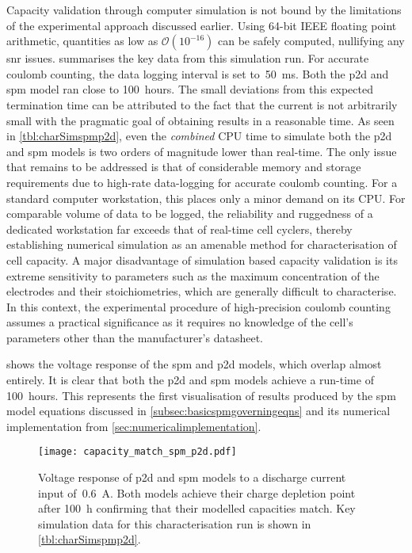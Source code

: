 Capacity validation through computer simulation  is not bound by the limitations
of the experimental approach discussed earlier. Using 64-bit IEEE floating point
arithmetic,  quantities  as  low  as  ${\mathcal{O}(10^{-16})}$  can  be  safely
computed, nullifying  any \gls{snr} issues.   summarises
the key data  from this simulation run. For accurate  coulomb counting, the data
logging  interval  is set  to~\SI{50}{\milli\second}.  Both the  \gls{p2d}  and
\gls{spm} model ran close to 100~hours.  The small deviations from this expected
termination  time  can  be attributed  to  the  fact  that  the current  is  not
arbitrarily small with  the pragmatic goal of obtaining results  in a reasonable
time. As seen in \cref{tbl:charSimspmp2d},  even the \emph{combined} CPU time to
simulate both  the \gls{p2d}  and \gls{spm}  models is  two orders  of magnitude
lower than  real-time. The only  issue that remains to  be addressed is  that of
considerable memory and  storage requirements due to  high-rate data-logging for
accurate coulomb counting. For a standard computer workstation, this places only
a minor  demand on  its CPU.  For comparable volume  of data  to be  logged, the
reliability  and ruggedness  of  a  dedicated workstation  far  exceeds that  of
real-time cell cyclers, thereby establishing numerical simulation as an amenable
method for characterisation of cell capacity. A major disadvantage of simulation
based capacity validation  is its extreme sensitivity to parameters  such as the
maximum concentration  of the  electrodes and  their stoichiometries,  which are
generally difficult to characterise. In this context, the experimental procedure
of  high-precision  coulomb counting  assumes  a  practical significance  as  it
requires no  knowledge of  the cell's parameters  other than  the manufacturer's
datasheet.





  shows  the  voltage  response  of  the  \gls{spm}  and
\gls{p2d}  models,  which   overlap almost entirely.  It  is  clear  that   both  the  \gls{p2d}
and  \gls{spm}  models   achieve  a  run-time  of   100~hours.  This  represents
the   first  visualisation   of  results   produced  by   the  \gls{spm}   model
equations  discussed  in \cref{subsec:basicspmgoverningeqns} and  its  numerical
implementation  from \cref{sec:numericalimplementation}.

\begin{figure}[!htbp]
    \centering
    \texttt{[image: capacity\_match\_spm\_p2d.pdf]}
    \caption[Voltage response of  and  models
    for capacity validation]{Voltage response of \gls{p2d} and \gls{spm} models
        to a discharge current input of~\SI{0.6}{A}. Both models achieve their
        charge depletion point after \approx\SI{100}{\hour} confirming that
        their modelled capacities match. Key simulation data for this
    characterisation run is shown in \cref{tbl:charSimspmp2d}.}
    \label{fig:capcharspmp2d}
\end{figure}

